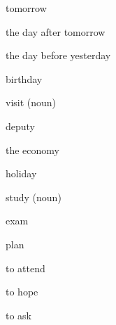 \begin{flashcard}{\LARGE tomorrow}
\LARGE {}
\end{flashcard}
\begin{flashcard}{\LARGE the day after tomorrow}
\LARGE {}
\end{flashcard}
\begin{flashcard}{\LARGE the day before yesterday}
\LARGE {}
\end{flashcard}
\begin{flashcard}{\LARGE birthday}
\LARGE {}
\end{flashcard}
\begin{flashcard}{\LARGE visit (noun)}
\LARGE {}
\end{flashcard}
\begin{flashcard}{\LARGE deputy}
\LARGE {}
\end{flashcard}
\begin{flashcard}{\LARGE the economy}
\LARGE {}
\end{flashcard}
\begin{flashcard}{\LARGE holiday}
\LARGE {}
\end{flashcard}
\begin{flashcard}{\LARGE study (noun)}
\LARGE {}
\end{flashcard}
\begin{flashcard}{\LARGE exam}
\LARGE {}
\end{flashcard}
\begin{flashcard}{\LARGE plan}
\LARGE {}
\end{flashcard}
\begin{flashcard}{\LARGE to attend}
\LARGE {}
\end{flashcard}
\begin{flashcard}{\LARGE to hope}
\LARGE {}
\end{flashcard}
\begin{flashcard}{\LARGE to ask}
\LARGE {}
\end{flashcard}
